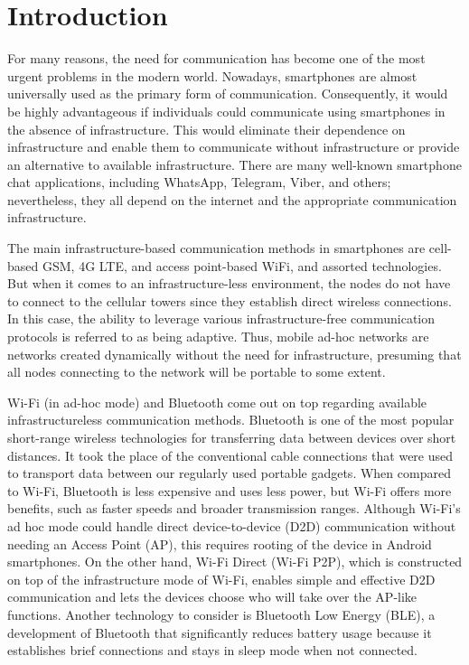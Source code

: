 \section{Introduction}

For many reasons, the need for communication has become one of the most urgent
problems in the modern world. Nowadays, smartphones are almost universally used
as the primary form of communication. Consequently, it would be highly
advantageous if individuals could communicate using smartphones in the absence
of infrastructure. This would eliminate their dependence on infrastructure and
enable them to communicate without infrastructure or provide an alternative to
available infrastructure. There are many well-known smartphone chat
applications, including WhatsApp, Telegram, Viber, and others;
nevertheless, they all depend on the internet and the appropriate communication
infrastructure.


The main infrastructure-based communication methods in smartphones are
cell-based GSM, 4G LTE, and access point-based WiFi, and assorted technologies.
But when it comes to an infrastructure-less environment, the nodes do not have
to connect to the cellular towers since they establish direct wireless connections. In this case,
the ability to leverage various infrastructure-free communication protocols is
referred to as being adaptive. Thus, mobile ad-hoc networks are networks
created dynamically without the need for infrastructure, presuming that all
nodes connecting to the network will be portable to some
extent\cite{chlamtac2003}.

Wi-Fi (in ad-hoc mode) and Bluetooth come out on top regarding available
infrastructureless communication methods. Bluetooth is one of the most popular
short-range wireless technologies for transferring data between devices over
short distances. It took the place of the conventional cable connections that
were used to transport data between our regularly used portable gadgets. When
compared to Wi-Fi, Bluetooth is less expensive and uses less power, but Wi-Fi
offers more benefits, such as faster speeds and broader transmission ranges.
Although Wi-Fi's ad hoc mode could handle direct device-to-device (D2D)
communication without needing an Access Point (AP), this requires rooting of
the device in Android smartphones\cite{soares2017}. On the other hand, Wi-Fi
Direct (Wi-Fi P2P), which is
constructed on top of the infrastructure mode of Wi-Fi, enables simple and
effective D2D communication and lets the devices choose who will take over the
AP-like functions. Another technology to consider is Bluetooth Low Energy
(BLE), a development of Bluetooth that significantly reduces battery usage
because it establishes brief connections and stays in sleep mode when not
connected.

